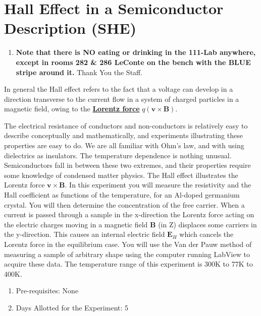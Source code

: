 \documentclass{../lab}
\begin{document}
\maketitle

\tableofcontents

\section{Hall Effect in a Semiconductor Description (SHE)}

\begin{enumerate}
    \item \textbf{Note that there is NO eating or drinking in the 111-Lab anywhere, except in rooms 282 \& 286 LeConte on the bench with the BLUE stripe around it.} Thank You the Staff.

\end{enumerate}

In general the Hall effect refers to the fact that a voltage can develop in a direction transverse to the current flow in a system of charged particles in a magnetic field, owing to the \href{http://experimentationlab.berkeley.edu/sites/default/files/Lorentz\%20force.pdf}{\textbf{Lorentz force}} $q(\mathbf{v} \times \mathbf{B})$.

The electrical resistance of conductors and non-conductors is relatively easy to describe conceptually and mathematically, and experiments illustrating these properties are easy to do. We are all familiar with Ohm's law, and with using dielectrics as insulators. The temperature dependence is nothing unusual. Semiconductors fall in between these two extremes, and their properties require some knowledge of condensed matter physics. The Hall effect illustrates the Lorentz force $\mathbf{v} \times \mathbf{B}$. In this experiment you will measure the resistivity and the Hall coefficient as functions of the temperature, for an Al-doped germanium crystal. You will then determine the concentration of the free carrier. When a current is passed through a sample in the x-direction the Lorentz force acting on the electric charges moving in a magnetic field \textbf{B} (in Z) displaces some carriers in the y-direction. This causes an internal electric field $\mathbf{E}_{H}$ which cancels the Lorentz force in the equilibrium case. You will use the Van der Pauw method of measuring a sample of arbitrary shape using the computer running LabView to acquire these data. The temperature range of this experiment is 300K to 77K to 400K.

\begin{enumerate}
    \item Pre-requisites: None

    \item Days Allotted for the Experiment: 5
\end{enumerate}
\end{document}
